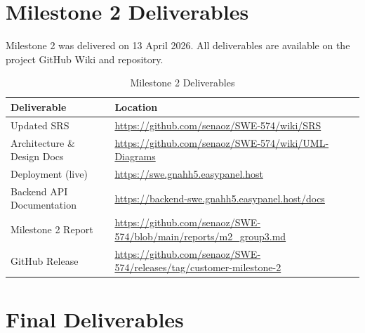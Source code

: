 \documentclass[10pt,a4paper]{report}
\begin{document}
\section{Milestone 2 Deliverables}

Milestone 2 was delivered on 13 April 2026. All deliverables are available on the project GitHub Wiki and repository.

\begin{table}[h]
    \centering
    \begin{tabularx}{\textwidth}{|l|X|}
        \hline
        \textbf{Deliverable}                  & \textbf{Location}                                                                          \\
        \hline
        Updated SRS                           & \url{https://github.com/senaoz/SWE-574/wiki/SRS}                                           \\
        \hline
        Architecture \& Design Docs           & \url{https://github.com/senaoz/SWE-574/wiki/UML-Diagrams}                                  \\
        \hline
        Deployment (live)                     & \url{https://swe.gnahh5.easypanel.host}                                                    \\
        \hline
        Backend API Documentation             & \url{https://backend-swe.gnahh5.easypanel.host/docs}                                       \\
        \hline
        Milestone 2 Report                    & \url{https://github.com/senaoz/SWE-574/blob/main/reports/m2\_group3.md}                    \\
        \hline
        GitHub Release                        & \url{https://github.com/senaoz/SWE-574/releases/tag/customer-milestone-2}                  \\
        \hline
    \end{tabularx}
    \caption{Milestone 2 Deliverables}
\end{table}

\section{Final Deliverables}
\end{document}
